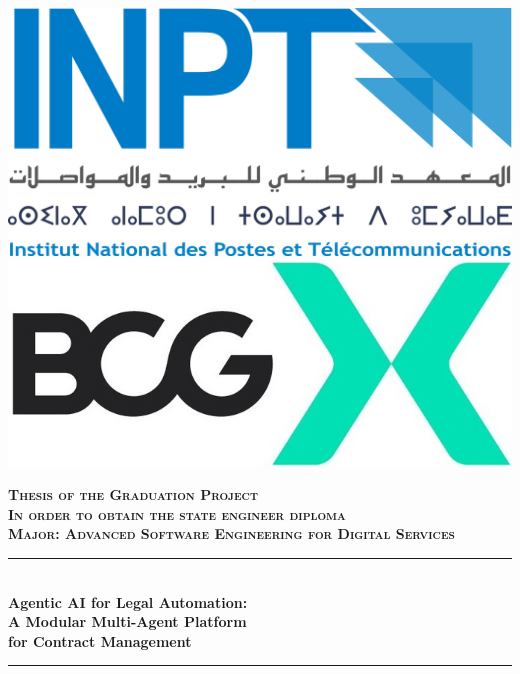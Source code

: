 \begin{titlepage}
  \thispagestyle{empty}
  
  \vspace{0.7cm}

  \includegraphics[scale=0.1]{Images/Logo_inpt.png} 
  \hfill 
  \includegraphics[scale=0.45]{Images/BCG_X.jpg}

  \vspace{0.5cm}
  \begin{center}
  {\large \textsc{\textbf{Thesis of the Graduation Project}}}\\[0.1cm]
  {\large \textsc{\textbf{In order to obtain the state engineer diploma}}}\\[0.1cm]
  {\large \textsc{\textbf{Major: \textbf{Advanced Software Engineering for Digital Services}}}} \\[0.1cm]
  \vspace{0.5cm}

  \rule{\linewidth}{0.3mm} \\[0.6cm]   %
  {\huge \textbf{Agentic AI for Legal Automation:} \\[0.2cm] \vspace{0.1cm} \textbf{A Modular Multi-Agent Platform} \\[0.3cm] \vspace{0.15cm} \textbf{for Contract Management}}\\ [0.6cm]
  \rule{\linewidth}{0.4mm} \\[0.4cm]
  \vspace{1.3cm}


\end{center}
\end{titlepage}
